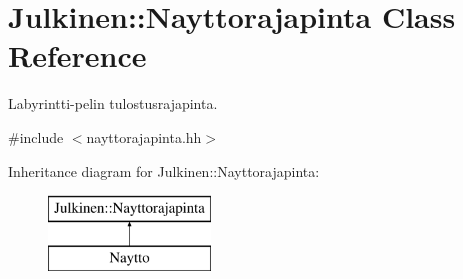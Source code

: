 \hypertarget{class_julkinen_1_1_nayttorajapinta}{}\section{Julkinen\+:\+:Nayttorajapinta Class Reference}
\label{class_julkinen_1_1_nayttorajapinta}


Labyrintti-\/pelin tulostusrajapinta.  




{\ttfamily \#include $<$nayttorajapinta.\+hh$>$}

Inheritance diagram for Julkinen\+:\+:Nayttorajapinta\+:\begin{figure}[H]
\begin{center}
\leavevmode
\includegraphics[height=2.000000cm]{class_julkinen_1_1_nayttorajapinta}
\end{center}
\end{figure}
